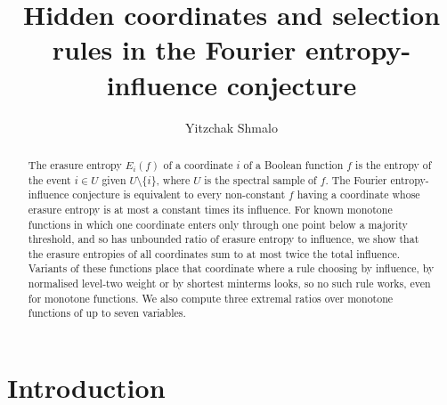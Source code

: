 \documentclass[11pt]{amsart}
\title{Hidden coordinates and selection rules in the Fourier entropy-influence conjecture}
\author{Yitzchak Shmalo}
\date{}
\theoremstyle{remark}
\begin{document}
\begin{abstract}
The erasure entropy $E_i(f)$ of a coordinate $i$ of a Boolean function $f$ is the entropy of the event $i\in U$ given
$U\setminus\{i\}$, where $U$ is the spectral sample of $f$. The Fourier entropy-influence conjecture is
equivalent to every non-constant $f$ having a coordinate whose erasure entropy is at most a constant times its
influence. For known monotone functions in which one coordinate enters only through one point below a majority
threshold, and so has unbounded ratio of erasure entropy to influence, we show that the erasure entropies of all
coordinates sum to at most twice the total influence. Variants of these functions place that coordinate where a rule
choosing by influence, by normalised level-two weight or by shortest minterms looks, so no such rule works, even for
monotone functions. We also compute three extremal ratios over monotone functions of up to seven variables.
\end{abstract}


\maketitle

\section{Introduction}\label{sec:intro}
\end{document}
